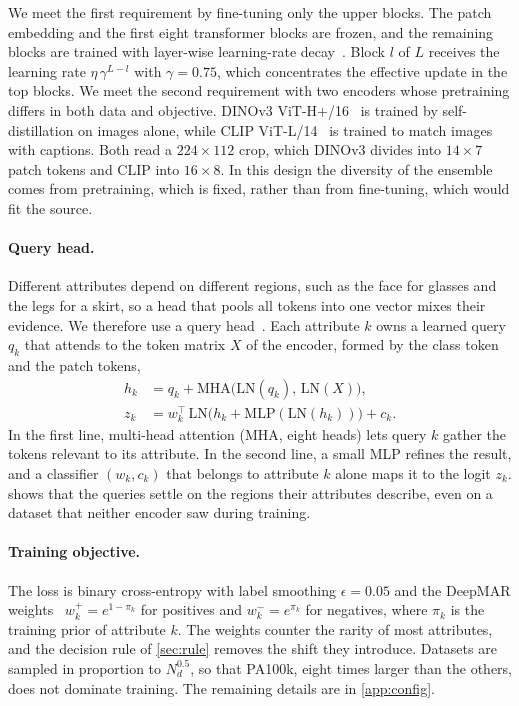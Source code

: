 \documentclass[10pt,twocolumn,letterpaper]{article}
\begin{document}
We meet the first requirement by fine-tuning only the upper blocks. The patch embedding and the first eight transformer blocks are frozen, and the remaining blocks are trained with layer-wise learning-rate decay~\cite{beit}. Block $l$ of $L$ receives the learning rate $\eta\,\gamma^{L-l}$ with $\gamma=0.75$, which concentrates the effective update in the top blocks. We meet the second requirement with two encoders whose pretraining differs in both data and objective. DINOv3 ViT-H+/16~\cite{dinov3} is trained by self-distillation on images alone, while CLIP ViT-L/14~\cite{clip} is trained to match images with captions. Both read a $224\times112$ crop, which DINOv3 divides into $14\times7$ patch tokens and CLIP into $16\times8$. In this design the diversity of the ensemble comes from pretraining, which is fixed, rather than from fine-tuning, which would fit the source.

\paragraph{Query head.} Different attributes depend on different regions, such as the face for glasses and the legs for a skirt, so a head that pools all tokens into one vector mixes their evidence. We therefore use a query head~\cite{q2l,mldecoder}. Each attribute $k$ owns a learned query $q_k$ that attends to the token matrix $X$ of the encoder, formed by the class token and the patch tokens,
\begin{align}
h_k &= q_k + \mathrm{MHA}\big(\mathrm{LN}(q_k),\,\mathrm{LN}(X)\big),\\
z_k &= w_k^{\top}\,\mathrm{LN}\big(h_k + \mathrm{MLP}(\mathrm{LN}(h_k))\big) + c_k .
\end{align}
In the first line, multi-head attention (MHA, eight heads) lets query $k$ gather the tokens relevant to its attribute. In the second line, a small MLP refines the result, and a classifier $(w_k,c_k)$ that belongs to attribute $k$ alone maps it to the logit $z_k$.  shows that the queries settle on the regions their attributes describe, even on a dataset that neither encoder saw during training.

\paragraph{Training objective.} The loss is binary cross-entropy with label smoothing $\epsilon=0.05$ and the DeepMAR weights~\cite{deepmar} $w_k^{+}=e^{1-\pi_k}$ for positives and $w_k^{-}=e^{\pi_k}$ for negatives, where $\pi_k$ is the training prior of attribute $k$. The weights counter the rarity of most attributes, and the decision rule of \cref{sec:rule} removes the shift they introduce. Datasets are sampled in proportion to $N_d^{0.5}$, so that PA100k, eight times larger than the others, does not dominate training. The remaining details are in \cref{app:config}.
\end{document}
